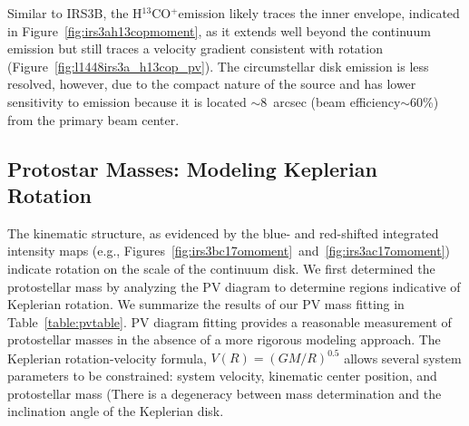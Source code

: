 \documentclass[twocolumn, 12pt,trackchanges]{aastex63}
\newcommand{\htcop}{H$^{13}$CO$^+$}
\newcommand{\ab}{$\sim$}
\begin{document}
Similar to IRS3B, the \htcop\space emission likely traces the inner envelope, indicated in Figure~\ref{fig:irs3ah13copmoment}, as it extends well beyond the continuum emission but still traces a velocity gradient consistent with rotation (Figure~\ref{fig:l1448irs3a_h13cop_pv}). The circumstellar disk emission is less resolved, however, due to the compact nature of the source and has lower sensitivity to emission because it is located \ab8~arcsec (beam efficiency\ab60\%) from the primary beam center. 

\subsection{Protostar Masses: Modeling Keplerian Rotation}
The kinematic structure, as evidenced by the blue- and red-shifted integrated intensity maps (e.g., Figures~\ref{fig:irs3bc17omoment}~and~\ref{fig:irs3ac17omoment}) indicate rotation on the scale of the continuum disk. We first determined the protostellar mass by analyzing the PV diagram to determine regions indicative of Keplerian rotation. We summarize the results of our PV mass fitting in Table~\ref{table:pvtable}. PV diagram fitting provides a reasonable measurement of protostellar masses in the absence of a more rigorous modeling approach. The Keplerian rotation-velocity formula, $V(R) = (GM/R)^{0.5}$ allows several system parameters to be constrained: system velocity, kinematic center position, and protostellar mass (There is a degeneracy between mass determination and the inclination angle of the Keplerian disk. 
\end{document}
